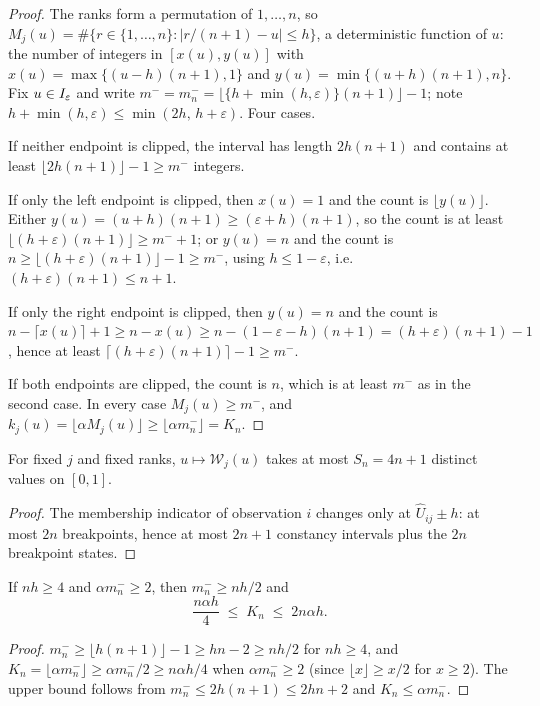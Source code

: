 \begin{proof}
The ranks form a permutation of $1,\ldots,n$, so
$M_j(u)=\#\{r\in\{1,\ldots,n\}:|r/(n+1)-u|\le h\}$, a deterministic
function of $u$: the number of integers in
$[x(u),y(u)]$ with $x(u)=\max\{(u-h)(n+1),1\}$ and
$y(u)=\min\{(u+h)(n+1),n\}$.  Fix $u\in I_\varepsilon$ and write
$m^-=m_n^-=\lfloor\{h+\min(h,\varepsilon)\}(n+1)\rfloor-1$; note
$h+\min(h,\varepsilon)\le\min(2h,\,h+\varepsilon)$.  Four cases.

If neither endpoint is clipped, the interval has length $2h(n+1)$ and
contains at least $\lfloor2h(n+1)\rfloor-1\ge m^-$ integers.

If only the left endpoint is clipped, then $x(u)=1$ and the count is
$\lfloor y(u)\rfloor$.  Either $y(u)=(u+h)(n+1)\ge(\varepsilon+h)(n+1)$,
so the count is at least
$\lfloor(h+\varepsilon)(n+1)\rfloor\ge m^-+1$; or $y(u)=n$ and the count
is $n\ge\lfloor(h+\varepsilon)(n+1)\rfloor-1\ge m^-$, using
$h\le1-\varepsilon$, i.e.\ $(h+\varepsilon)(n+1)\le n+1$.

If only the right endpoint is clipped, then $y(u)=n$ and the count is
$n-\lceil x(u)\rceil+1\ge n-x(u)\ge n-(1-\varepsilon-h)(n+1)
=(h+\varepsilon)(n+1)-1$, hence at least
$\lceil(h+\varepsilon)(n+1)\rceil-1\ge m^-$.

If both endpoints are clipped, the count is $n$, which is at least
$m^-$ as in the second case.  In every case $M_j(u)\ge m^-$, and
$k_j(u)=\lfloor\alpha M_j(u)\rfloor\ge\lfloor\alpha m_n^-\rfloor=K_n$.
\end{proof}

\begin{lemma}\label{lem:app-states}
For fixed $j$ and fixed ranks, $u\mapsto\mathcal W_j(u)$ takes at most
$S_n=4n+1$ distinct values on $[0,1]$.
\end{lemma}

\begin{proof}
The membership indicator of observation $i$ changes only at
$\widehat U_{ij}\pm h$: at most $2n$ breakpoints, hence at most $2n+1$
constancy intervals plus the $2n$ breakpoint states.
\end{proof}

\begin{lemma}\label{lem:app-kn}
If $nh\ge4$ and $\alpha m_n^-\ge2$, then $m_n^-\ge nh/2$ and
\[
 \frac{n\alpha h}{4}\;\le\;K_n\;\le\;2n\alpha h .
\]
\end{lemma}

\begin{proof}
$m_n^-\ge\lfloor h(n+1)\rfloor-1\ge h n-2\ge nh/2$ for $nh\ge4$, and
$K_n=\lfloor\alpha m_n^-\rfloor\ge\alpha m_n^-/2\ge n\alpha h/4$ when
$\alpha m_n^-\ge2$ (since $\lfloor x\rfloor\ge x/2$ for $x\ge2$).  The
upper bound follows from $m_n^-\le2h(n+1)\le2hn+2$ and
$K_n\le\alpha m_n^-$.
\end{proof}

